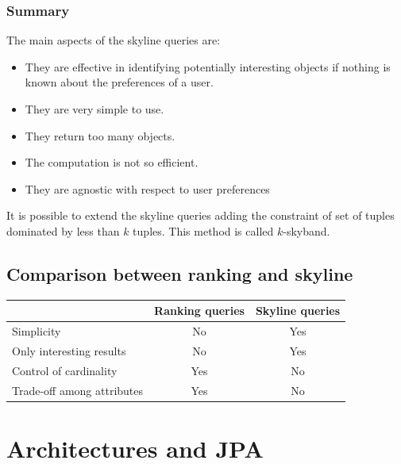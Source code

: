 \documentclass[12pt, a4paper]{report}
\begin{document}
    \subsection{Summary}
    The main aspects of the skyline queries are: 
    \begin{itemize}
        \item They are effective in identifying potentially interesting objects if nothing is known about the preferences of a user. 
        \item They are very simple to use. 
        \item They return too many objects. 
        \item The computation is not so efficient. 
        \item They are agnostic with respect to user preferences
    \end{itemize}
    It is possible to extend the skyline queries adding the constraint of set of tuples dominated by less than $k$ tuples. This method is called $k$-skyband.

    \section{Comparison between ranking and skyline}
    \begin{table}[H]
        \centering
        \begin{tabular}{l|cc|}
        \cline{2-3}
                                                         & \textbf{Ranking queries} & \textbf{Skyline queries} \\ \hline
        \multicolumn{1}{|l|}{Simplicity}                 & No              & Yes             \\
        \multicolumn{1}{|l|}{Only interesting results}   & No              & Yes             \\
        \multicolumn{1}{|l|}{Control of cardinality}     & Yes             & No              \\
        \multicolumn{1}{|l|}{Trade-off among attributes} & Yes             & No              \\ \hline
        \end{tabular}
    \end{table}

\newpage 

\chapter{Architectures and JPA}
\end{document}

